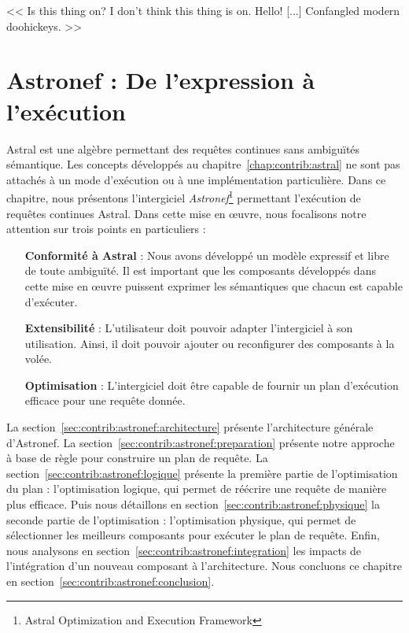 \begin{savequote}[6cm]
<< Is this thing on? I don't think this thing is on. Hello! [...] Confangled modern doohickeys. >>
\end{savequote}

\chapter{Astronef : De l'expression à l'exécution}\label{chap:contrib:astronef}
\chaptertoc

Astral est une algèbre permettant des requêtes continues sans ambiguïtés sémantique. Les concepts développés au chapitre~\ref{chap:contrib:astral} ne sont pas attachés à un mode d'exécution ou à une implémentation particulière. Dans ce chapitre, nous présentons l'intergiciel \textit{Astronef}\footnote{Astral Optimization and Execution Framework} permettant l'exécution de requêtes continues Astral. Dans cette mise en œuvre, nous focalisons notre attention sur trois points en particuliers :
\begin{itemize}
	\item[\textbf{Conformité à Astral}] : Nous avons développé un modèle expressif et libre de toute ambiguïté. Il est important que les composants développés dans cette mise en œuvre puissent exprimer les sémantiques que chacun est capable d'exécuter.
	\item[\textbf{Extensibilité}] : L'utilisateur doit pouvoir adapter l'intergiciel à son utilisation. Ainsi, il doit pouvoir ajouter ou reconfigurer des composants à la volée.
	\item[\textbf{Optimisation}] : L'intergiciel doit être capable de fournir un plan d'exécution efficace pour une requête donnée.
\end{itemize}

La section~\ref{sec:contrib:astronef:architecture} présente l'architecture générale d'Astronef. La section~\ref{sec:contrib:astronef:preparation} présente notre approche à base de règle pour construire un plan de requête. La section~\ref{sec:contrib:astronef:logique} présente la première partie de l'optimisation du plan : l'optimisation logique, qui permet de réécrire une requête de manière plus efficace. Puis nous détaillons en section~\ref{sec:contrib:astronef:physique} la seconde partie de l'optimisation : l'optimisation physique, qui permet de sélectionner les meilleurs composants pour exécuter le plan de requête. Enfin, nous analysons en section~\ref{sec:contrib:astronef:integration} les impacts de l'intégration d'un nouveau composant à l'architecture. Nous concluons ce chapitre en section~\ref{sec:contrib:astronef:conclusion}.

\lstset{language=PrologAstral}






